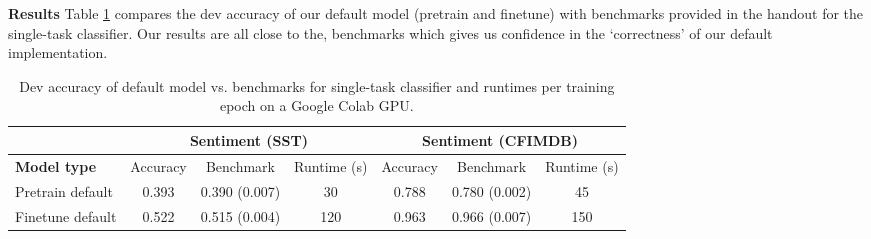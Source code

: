\documentclass{article}
\begin{document}
\textbf{Results}
Table \ref{tab: single} compares the dev accuracy of our default model (pretrain and finetune) with benchmarks provided in the handout for the single-task classifier. Our results are all close to the, benchmarks which gives us confidence in the `correctness' of our default implementation. 
\begin{table}[h]
\footnotesize
\centering
\begin{tabular}{|l|ccc|ccc|}
\hline
  & \multicolumn{3}{c|}{\textbf{Sentiment (SST)}} & \multicolumn{3}{c|}{\textbf{Sentiment (CFIMDB)}} \\ \hline
\textbf{Model type}       & Accuracy       & Benchmark & Runtime (s)          & Accuracy        & Benchmark & Runtime (s)           \\ \hline
Pretrain default & 0.393           & 0.390 (0.007) & 30    & 0.788            & 0.780 (0.002)  & 45     \\
Finetune default & 0.522           & 0.515 (0.004) & 120    & 0.963            & 0.966 (0.007) & 150      \\ \hline
\end{tabular}
\caption{Dev accuracy of default model vs. benchmarks for single-task classifier and runtimes per training epoch on a Google Colab GPU.}
\label{tab: single}
\end{table}
\vspace{-0.5cm}
\end{document}
